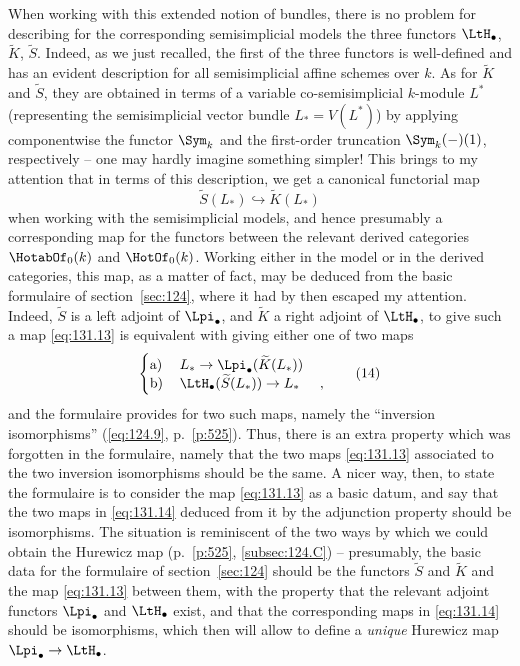 When working with this extended notion of bundles, there is no problem
for describing for the corresponding semisimplicial
models the three functors $\LtH_\bullet$, $\widetilde K$,
$\widetilde S$. Indeed, as we just recalled, the first of the three
functors is well-defined and has an evident description for all
semisimplicial affine schemes over $k$. As for $\widetilde K$ and
$\widetilde S$, they are obtained in terms of a variable
co-semisimplicial $k$-module $L^*$ (representing the semisimplicial
vector bundle $L_*=V(L^*)$) by applying componentwise the functor
$\Sym_k$ and the first-order truncation $\Sym_k({-})(1)$, respectively
-- one may hardly imagine something simpler! This brings to my
attention that in terms of this description, we get a canonical
functorial map
\begin{equation}
  \label{eq:131.13}
  \widetilde S(L_*) \hookrightarrow \widetilde K(L_*)\tag{13}
\end{equation}
when working with the semisimplicial models, and hence presumably a
corresponding map for the functors between the relevant derived
categories $\HotabOf_0(k)$ and $\HotOf_0(k)$. Working either in the
model or in the derived categories, this map, as a matter of fact, may
be deduced from the basic formulaire of section~\ref{sec:124}, where
it had by then escaped my attention. Indeed, $\widetilde S$ is a left
adjoint of $\Lpi_\bullet$, and $\widetilde K$ a right adjoint of
$\LtH_\bullet$, to give such a map \eqref{eq:131.13} is equivalent
with giving either one of two maps
\begin{equation}
  \label{eq:131.14}
  \left\{
    \begin{tabular}{@{}lll@{}}
      a) & $L_*\to \Lpi_\bullet(\widetilde K(L_*))$ & \\
      b) & $\LtH_\bullet(\widetilde S(L_*)) \to L_*$ & ,
    \end{tabular}
  \right.\tag{14}
\end{equation}
and the formulaire provides for two such maps, namely the ``inversion
isomorphisms'' (\eqref{eq:124.9}, p.~\ref{p:525}). Thus, there is an
extra property which was forgotten in the formulaire, namely that the
two maps \eqref{eq:131.13} associated to the two inversion
isomorphisms should be the same. A nicer way, then, to state the
formulaire is to consider the map \eqref{eq:131.13} as a basic datum,
and say that the two maps in \eqref{eq:131.14} deduced from it by the
adjunction property should be isomorphisms. The situation is
reminiscent of the two ways by which we could obtain the Hurewicz map
(p.~\ref{p:525}, \ref{subsec:124.C}) -- presumably, the basic data for
the formulaire of section~\ref{sec:124} should be the functors
$\widetilde S$ and $\widetilde K$ and the map \eqref{eq:131.13}
between them, with the property that the relevant adjoint functors
$\Lpi_\bullet$ and $\LtH_\bullet$ exist, and that the corresponding
maps in \eqref{eq:131.14} should be isomorphisms, which then will
allow to define a \emph{unique} Hurewicz map
$\Lpi_\bullet\to\LtH_\bullet$.

